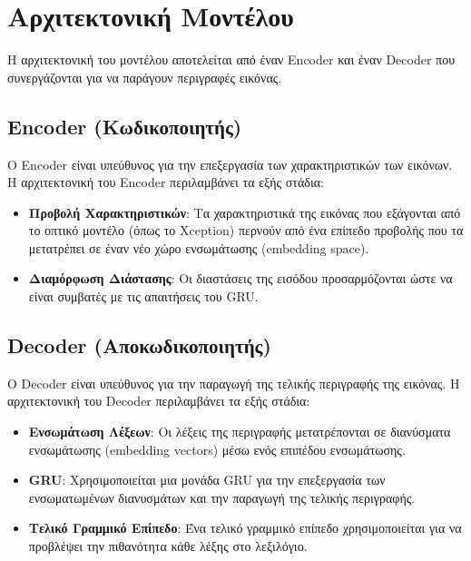 \documentclass[conference]{IEEEtran}
\begin{document}
\section{Αρχιτεκτονική Μοντέλου}

Η αρχιτεκτονική του μοντέλου αποτελείται από έναν \textlatin{Encoder} και έναν \textlatin{Decoder} που συνεργάζονται για να παράγουν περιγραφές εικόνας.

\subsection{\textlatin{Encoder} (Κωδικοποιητής)}

Ο \textlatin{Encoder} είναι υπεύθυνος για την επεξεργασία των χαρακτηριστικών των εικόνων. Η αρχιτεκτονική του \textlatin{Encoder} περιλαμβάνει τα εξής στάδια:

\begin{itemize}
    \item \textbf{Προβολή Χαρακτηριστικών}: Τα χαρακτηριστικά της εικόνας που εξάγονται από το οπτικό μοντέλο (όπως το \textlatin{Xception}) περνούν από ένα επίπεδο προβολής που τα μετατρέπει σε έναν νέο χώρο ενσωμάτωσης (\textlatin{embedding space}).
    \item \textbf{Διαμόρφωση Διάστασης}: Οι διαστάσεις της εισόδου προσαρμόζονται ώστε να είναι συμβατές με τις απαιτήσεις του \textlatin{GRU}.
\end{itemize}

\subsection{\textlatin{Decoder} (Αποκωδικοποιητής)}

Ο \textlatin{Decoder} είναι υπεύθυνος για την παραγωγή της τελικής περιγραφής της εικόνας. Η αρχιτεκτονική του \textlatin{Decoder} περιλαμβάνει τα εξής στάδια:

\begin{itemize}
    \item \textbf{Ενσωμάτωση Λέξεων}: Οι λέξεις της περιγραφής μετατρέπονται σε διανύσματα ενσωμάτωσης (\textlatin{embedding vectors}) μέσω ενός επιπέδου ενσωμάτωσης.
    \item \textbf{\textlatin{GRU}}: Χρησιμοποιείται μια μονάδα \textlatin{GRU} για την επεξεργασία των ενσωματωμένων διανυσμάτων και την παραγωγή της τελικής περιγραφής.
    \item \textbf{Τελικό Γραμμικό Επίπεδο}: Ένα τελικό γραμμικό επίπεδο χρησιμοποιείται για να προβλέψει την πιθανότητα κάθε λέξης στο λεξιλόγιο.
\end{itemize}
\end{document}
